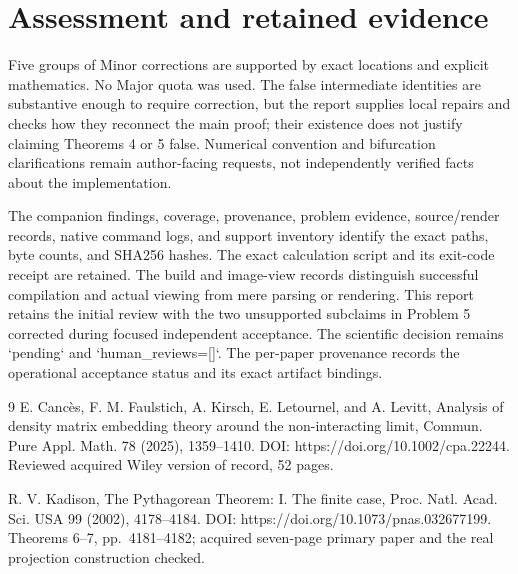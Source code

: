 \documentclass[10pt]{article}
\begin{document}
\section*{Assessment and retained evidence}
Five groups of Minor corrections are supported by exact locations and explicit mathematics. No Major quota was used. The false intermediate identities are substantive enough to require correction, but the report supplies local repairs and checks how they reconnect the main proof; their existence does not justify claiming Theorems 4 or 5 false. Numerical convention and bifurcation clarifications remain author-facing requests, not independently verified facts about the implementation.\par
The companion findings, coverage, provenance, problem evidence, source/render records, native command logs, and support inventory identify the exact paths, byte counts, and SHA256 hashes. The exact calculation script and its exit-code receipt are retained. The build and image-view records distinguish successful compilation and actual viewing from mere parsing or rendering. This report retains the initial review with the two unsupported subclaims in Problem 5 corrected during focused independent acceptance. The scientific decision remains `pending` and `human\_reviews=[]`. The per-paper provenance records the operational acceptance status and its exact artifact bindings.\par
9 E. Cancès, F. M. Faulstich, A. Kirsch, E. Letournel, and A. Levitt, Analysis of density matrix embedding theory around the non-interacting limit, Commun. Pure Appl. Math. 78 (2025), 1359–1410. DOI: https://doi.org/10.1002/cpa.22244. Reviewed acquired Wiley version of record, 52 pages.\par
R. V. Kadison, The Pythagorean Theorem: I. The finite case, Proc. Natl. Acad. Sci. USA 99 (2002), 4178–4184. DOI: https://doi.org/10.1073/pnas.032677199. Theorems 6–7, pp. 4181–4182; acquired seven-page primary paper and the real projection construction checked.\par
\end{document}
